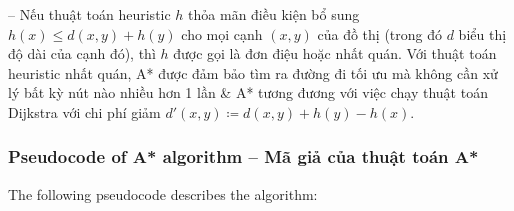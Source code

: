 \documentclass{article}
\begin{document}
-- Nếu thuật toán heuristic $h$ thỏa mãn điều kiện bổ sung $h(x)\le d(x,y) + h(y)$ cho mọi cạnh $(x,y)$ của đồ thị (trong đó $d$ biểu thị độ dài của cạnh đó), thì $h$ được gọi là đơn điệu hoặc nhất quán. Với thuật toán heuristic nhất quán, A* được đảm bảo tìm ra đường đi tối ưu mà không cần xử lý bất kỳ nút nào nhiều hơn 1 lần \& A* tương đương với việc chạy thuật toán Dijkstra với chi phí giảm $d'(x,y)\coloneqq d(x,y) + h(y) - h(x)$.


\subsubsection{Pseudocode of A* algorithm -- Mã giả của thuật toán A*}
The following pseudocode describes the algorithm: 
\end{document}

